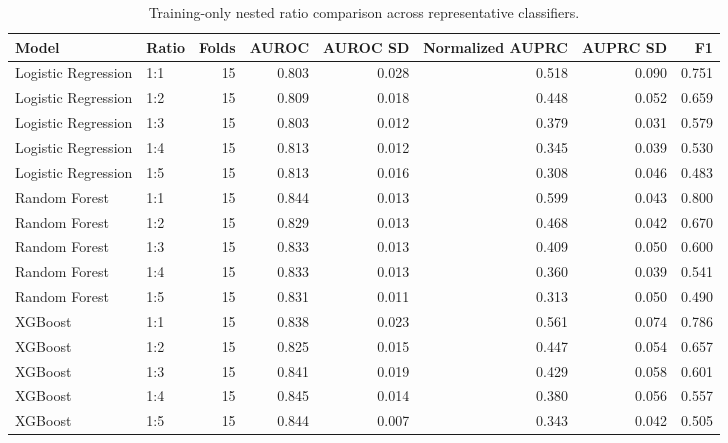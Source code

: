 \begin{table}[htbp]
\centering
\caption{Training-only nested ratio comparison across representative classifiers.}
\label{tab:robustness_recomputed}
\begin{tabular}{llrrrrrr}
\toprule
Model & Ratio & Folds & AUROC & AUROC SD & Normalized AUPRC & AUPRC SD & F1 \\
\midrule
Logistic Regression & 1:1 & 15 & 0.803 & 0.028 & 0.518 & 0.090 & 0.751 \\
Logistic Regression & 1:2 & 15 & 0.809 & 0.018 & 0.448 & 0.052 & 0.659 \\
Logistic Regression & 1:3 & 15 & 0.803 & 0.012 & 0.379 & 0.031 & 0.579 \\
Logistic Regression & 1:4 & 15 & 0.813 & 0.012 & 0.345 & 0.039 & 0.530 \\
Logistic Regression & 1:5 & 15 & 0.813 & 0.016 & 0.308 & 0.046 & 0.483 \\
Random Forest & 1:1 & 15 & 0.844 & 0.013 & 0.599 & 0.043 & 0.800 \\
Random Forest & 1:2 & 15 & 0.829 & 0.013 & 0.468 & 0.042 & 0.670 \\
Random Forest & 1:3 & 15 & 0.833 & 0.013 & 0.409 & 0.050 & 0.600 \\
Random Forest & 1:4 & 15 & 0.833 & 0.013 & 0.360 & 0.039 & 0.541 \\
Random Forest & 1:5 & 15 & 0.831 & 0.011 & 0.313 & 0.050 & 0.490 \\
XGBoost & 1:1 & 15 & 0.838 & 0.023 & 0.561 & 0.074 & 0.786 \\
XGBoost & 1:2 & 15 & 0.825 & 0.015 & 0.447 & 0.054 & 0.657 \\
XGBoost & 1:3 & 15 & 0.841 & 0.019 & 0.429 & 0.058 & 0.601 \\
XGBoost & 1:4 & 15 & 0.845 & 0.014 & 0.380 & 0.056 & 0.557 \\
XGBoost & 1:5 & 15 & 0.844 & 0.007 & 0.343 & 0.042 & 0.505 \\
\bottomrule
\end{tabular}

\end{table}
